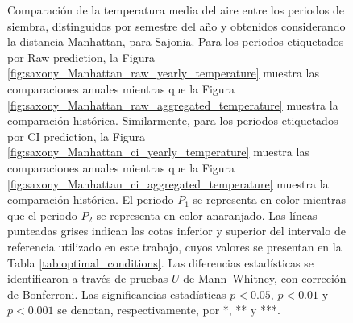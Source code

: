 \begin{figure}[htbp]
	\caption{
		Comparación de la temperatura media del aire entre los periodos de siembra, distinguidos por semestre del año y obtenidos considerando la distancia Manhattan, para Sajonia. Para los periodos etiquetados por Raw prediction, la Figura \ref{fig:saxony_Manhattan_raw_yearly_temperature} muestra las comparaciones anuales mientras que la Figura \ref{fig:saxony_Manhattan_raw_aggregated_temperature} muestra la comparación histórica. Similarmente, para los periodos etiquetados por CI prediction, la Figura \ref{fig:saxony_Manhattan_ci_yearly_temperature} muestra las comparaciones anuales mientras que la Figura \ref{fig:saxony_Manhattan_ci_aggregated_temperature} muestra la comparación histórica. El periodo $P_1$ se representa en color mientras que el periodo $P_2$ se representa en color anaranjado. Las líneas punteadas grises indican las cotas inferior y superior del intervalo de referencia utilizado en este trabajo, cuyos valores se presentan en la Tabla \ref{tab:optimal_conditions}. Las diferencias estadísticas se identificaron a través de pruebas $U$ de Mann--Whitney, con correción de Bonferroni. Las significancias estadísticas $p<0.05$, $p<0.01$ y $p<0.001$ se denotan, respectivamente, por *, ** y ***.
	}
	\label{fig:saxony_Manhattan_average_temperature}
	
	
\end{figure}




